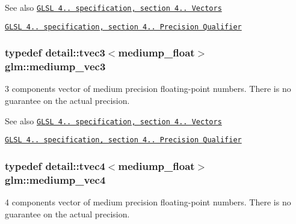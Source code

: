 \begin{DoxySeeAlso}{\-See also}
\href{http://www.opengl.org/registry/doc/GLSLangSpec.4.20.8.pdf}{\tt \-G\-L\-S\-L 4.. specification, section 4.. \-Vectors} 

\href{http://www.opengl.org/registry/doc/GLSLangSpec.4.20.8.pdf}{\tt \-G\-L\-S\-L 4.. specification, section 4.. \-Precision \-Qualifier} 
\end{DoxySeeAlso}
\hypertarget{group__core__precision_gafab50a7800793f88befe5d2a0120c65b}{
\subsubsection[{mediump\-\_\-vec3}]{\setlength{\rightskip}{0pt plus 5cm}typedef detail\-::tvec3$<$mediump\-\_\-float$>$ {\bf glm\-::mediump\-\_\-vec3}}}\label{group__core__precision_gafab50a7800793f88befe5d2a0120c65b}
3 components vector of medium precision floating-\/point numbers. \-There is no guarantee on the actual precision.

\begin{DoxySeeAlso}{\-See also}
\href{http://www.opengl.org/registry/doc/GLSLangSpec.4.20.8.pdf}{\tt \-G\-L\-S\-L 4.. specification, section 4.. \-Vectors} 

\href{http://www.opengl.org/registry/doc/GLSLangSpec.4.20.8.pdf}{\tt \-G\-L\-S\-L 4.. specification, section 4.. \-Precision \-Qualifier} 
\end{DoxySeeAlso}
\hypertarget{group__core__precision_ga592096fcf2ef1662f2c0dbbc7754e80c}{
\subsubsection[{mediump\-\_\-vec4}]{\setlength{\rightskip}{0pt plus 5cm}typedef detail\-::tvec4$<$mediump\-\_\-float$>$ {\bf glm\-::mediump\-\_\-vec4}}}\label{group__core__precision_ga592096fcf2ef1662f2c0dbbc7754e80c}
4 components vector of medium precision floating-\/point numbers. \-There is no guarantee on the actual precision.

